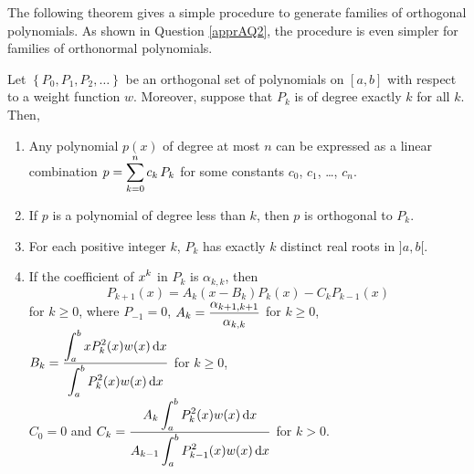 The following theorem gives a simple procedure to generate families of
orthogonal polynomials.  As shown in Question \ref{apprAQ2}, the
procedure is even simpler for families of orthonormal polynomials.

\begin{theorem}
Let $\left\{ P_0,P_1,P_2,\ldots \right\}$ be an orthogonal set of
polynomials on $[a,b]$ with respect to a weight function $w$.
Moreover, suppose that $P_k$ is of degree exactly $k$ for all $k$.  Then,
\begin{enumerate}
\item Any polynomial $p(x)$ of degree at most $n$ can be expressed as
a linear combination $\displaystyle p=\sum_{k=0}^n c_k\,P_k$
for some constants $c_0$, $c_1$, \ldots, $c_n$.
\item If $p$ is a polynomial of degree less than $k$, then $p$ is
orthogonal to $P_k$.
\item For each positive integer $k$, $P_k$ has exactly $k$
distinct real roots in $]a,b[$.
\item If the coefficient of $\displaystyle x^k$ in $P_k$ is
$\alpha_{k,k}$, then
\[
P_{k+1}(x) = A_k(x-B_k)P_k(x) - C_k P_{k-1}(x)
\]
for $k \geq 0$, where $P_{-1} = 0$,
$\displaystyle A_k = \frac{\alpha_{k+1,k+1}}{\alpha_{k,k}}$ for $k \geq 0$,\\
$\displaystyle B_k = \frac{\displaystyle \int_a^b xP_k^2(x)w(x) \,\mathrm{d}x}
{\displaystyle \int_a^b P_k^2(x)w(x)\,\mathrm{d}x}$ for $k\geq 0$,\\
$C_0 = 0$ and $\displaystyle
C_k = \frac{\displaystyle A_k\int_a^b P_k^2(x)w(x) \,\mathrm{d}x}
{\displaystyle A_{k-1} \int_a^b P_{k-1}^2(x)w(x) \,\mathrm{d}x}$
for $k>0$.
\end{enumerate}
\label{orthpoly}
\end{theorem}

